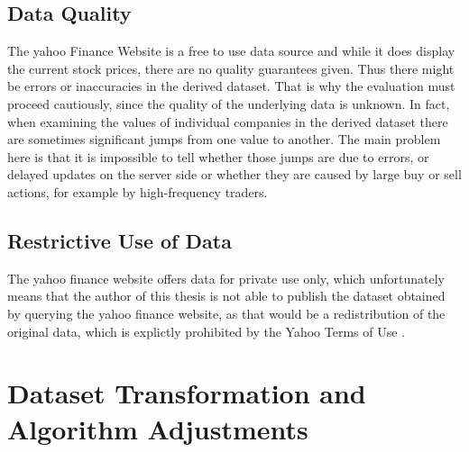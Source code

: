 \subsection{Data Quality}
\label{subsec_dataQuality}
The yahoo Finance Website is a free to use data source and while it does display the current stock prices, there are no quality guarantees given. Thus there might be errors or inaccuracies in the derived dataset. That is why the evaluation must proceed cautiously, since the quality of the underlying data is unknown. In fact, when examining the values of individual companies in the derived dataset there are sometimes significant jumps from one value to another. The main problem here is that it is impossible to tell whether those jumps are due to errors, or delayed updates on the server side or whether they are caused by large buy or sell actions, for example by high-frequency traders.  

\subsection{Restrictive Use of Data}
The yahoo finance website offers data for private use only, which unfortunately means that the author of this thesis is not able to publish the dataset obtained by querying the yahoo finance website, as that would be a redistribution of the original data, which is explictly prohibited by the Yahoo Terms of Use \cite{yahooTermsDeveloper}.

\section{Dataset Transformation and Algorithm Adjustments}
\label{sec_transformation}


